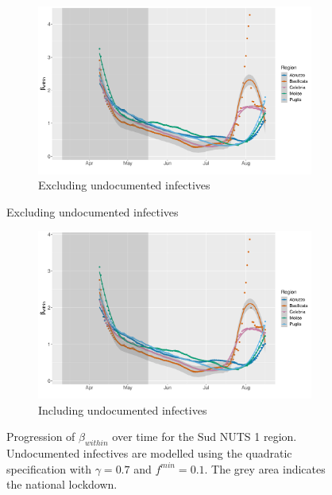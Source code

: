\documentclass[12pt]{article}
\begin{document}
\begin{appendices}
		\begin{figure}[H]
    	    \centering
    	    \begin{subfigure}{\textwidth}
    	      \centering
    	      \includegraphics[width=0.94\linewidth]{output/model_within_lag14_betawithin_Sud_rollingwindow30.pdf}
    	      \caption{Excluding undocumented infectives}
    	      \label{fig:beta_within_over_time_sud_lowsample_regular}
    	    \end{subfigure}\newline
        \end{figure}
        \begin{figure}[H]\ContinuedFloat
    	    \begin{subfigure}{\textwidth}
    	      \centering
    	      \includegraphics[width=0.94\linewidth]{output/model_within_lag14_betawithin_Sud_UndocQuadratic_rollingwindow30.pdf}
    	      \caption{Including undocumented infectives}
    	      \label{fig:beta_within_over_time_sud_lowsample_regular_undoc}
    	    \end{subfigure}
    	    \caption{Progression of $\beta_{within}$ over time for the Sud NUTS 1 region. Undocumented infectives are modelled using the quadratic specification with $\gamma = 0.7$ and $f^{min}=0.1$. The grey area indicates the national lockdown.}
    	    \label{fig:beta_within_over_time_sud_lowsample}
	    \end{figure}
		

\end{appendices}
\end{document}
